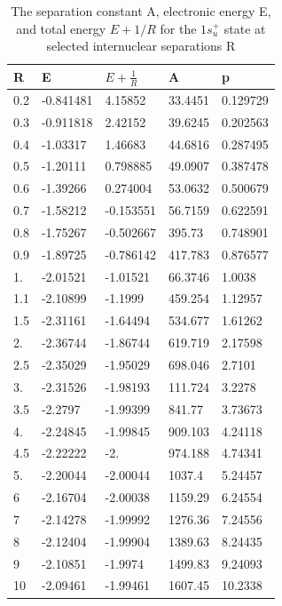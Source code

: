 \begin{table}[h!]
  \caption{The separation constant A, electronic energy E, and total energy $E+1/R$ for the $1s_u^{+}$ state at selected internuclear separations R}
  \centering
  \label{2sg}
		\begin{tabular}{ m{6em} m{6em}  m{6em}  m{6em} m{6em} }
			\hline
			R & E & $ E + \frac{1}{R} $ & A & p  \\ \hline \hline
  0.2 & -0.841481 & 4.15852 & 33.4451 & 0.129729\\
  0.3 & -0.911818 & 2.42152 & 39.6245 & 0.202563\\
  0.4 & -1.03317 & 1.46683 & 44.6816 & 0.287495\\
  0.5 & -1.20111 & 0.798885 & 49.0907 & 0.387478\\
  0.6 & -1.39266 & 0.274004 & 53.0632 & 0.500679\\
  0.7 & -1.58212 & -0.153551 & 56.7159 & 0.622591\\
  0.8 & -1.75267 & -0.502667 & 395.73 & 0.748901\\
  0.9 & -1.89725 & -0.786142 & 417.783 & 0.876577\\
  1. & -2.01521 & -1.01521 & 66.3746 & 1.0038\\
  1.1 & -2.10899 & -1.1999 & 459.254 & 1.12957\\
  1.5 & -2.31161 & -1.64494 & 534.677 & 1.61262\\
  2. & -2.36744 & -1.86744 & 619.719 & 2.17598\\
  2.5 & -2.35029 & -1.95029 & 698.046 & 2.7101\\
  3. & -2.31526 & -1.98193 & 111.724 & 3.2278\\
  3.5 & -2.2797 & -1.99399 & 841.77 & 3.73673\\
  4. & -2.24845 & -1.99845 & 909.103 & 4.24118\\
  4.5 & -2.22222 & -2. & 974.188 & 4.74341\\
  5. & -2.20044 & -2.00044 & 1037.4 & 5.24457\\
  6 & -2.16704 & -2.00038 & 1159.29 & 6.24554\\
  7 & -2.14278 & -1.99992 & 1276.36 & 7.24556\\
  8 & -2.12404 & -1.99904 & 1389.63 & 8.24435\\
  9 & -2.10851 & -1.9974 & 1499.83 & 9.24093\\
  10 & -2.09461 & -1.99461 & 1607.45 & 10.2338\\
		\hline
		\end{tabular}
\end{table}

